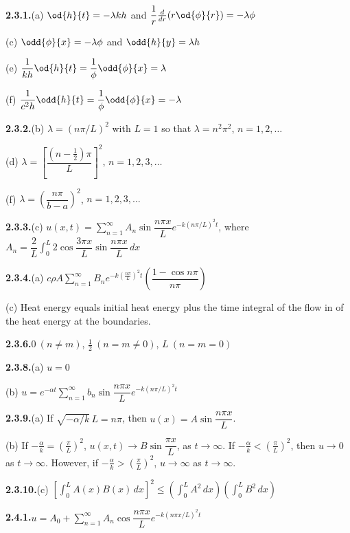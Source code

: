 \textbf{2.3.1.}\quad (a) $\od{h}{t} = -\lambda kh$ and $\dfrac{1}{r}\frac{d}{d r}\!\left(r\od{\phi}{r}\right) = -\lambda\phi$

\quad (c) $\odd{\phi}{x} = -\lambda\phi$ and $\odd{h}{y} = \lambda h$

\quad (e) $\dfrac{1}{kh}\od{h}{t} = \dfrac{1}{\phi}\odd{\phi}{x} = \lambda$

\quad (f) $\dfrac{1}{c^2 h}\odd{h}{t} = \dfrac{1}{\phi}\odd{\phi}{x} = -\lambda$

\medskip
\textbf{2.3.2.}\quad (b) $\lambda = (n\pi/L)^2$ with $L = 1$ so that $\lambda = n^2\pi^2$, $n = 1, 2, \ldots$

\quad (d) $\lambda = \left[\dfrac{(n-\frac{1}{2})\pi}{L}\right]^2$, $n = 1, 2, 3, \ldots$

\quad (f) $\lambda = \left(\dfrac{n\pi}{b-a}\right)^2$, $n = 1, 2, 3, \ldots$

\medskip
\textbf{2.3.3.}\quad (c) $u(x,t) = \sum_{n=1}^{\infty} A_n \sin\dfrac{n\pi x}{L} e^{-k(n\pi/L)^2 t}$, where
$A_n = \dfrac{2}{L}\int_0^L 2\cos\dfrac{3\pi x}{L}\sin\dfrac{n\pi x}{L}\,dx$

\medskip
\textbf{2.3.4.}\quad (a) $c\rho A \sum_{n=1}^{\infty} B_n e^{-k\left(\frac{n\pi}{L}\right)^2 t}\left(\dfrac{1-\cos n\pi}{n\pi}\right)$

\quad (c) Heat energy equals initial heat energy plus the time integral of the flow
in of the heat energy at the boundaries.

\medskip
\textbf{2.3.6.}\quad $0\ (n \neq m)$, $\frac{1}{2}\ (n = m \neq 0)$, $L\ (n = m = 0)$

\medskip
\textbf{2.3.8.}\quad (a) $u = 0$

\quad (b) $u = e^{-\alpha t}\sum_{n=1}^{\infty} b_n \sin\dfrac{n\pi x}{L} e^{-k(n\pi/L)^2 t}$

\medskip
\textbf{2.3.9.}\quad (a) If $\sqrt{-\alpha/k}\, L = n\pi$, then $u(x) = A\sin\dfrac{n\pi x}{L}$.

\quad (b) If $-\frac{\alpha}{k} = \left(\frac{\pi}{L}\right)^2$, $u(x,t) \to B\sin\dfrac{\pi x}{L}$, as $t \to \infty$. If $-\frac{\alpha}{k} < \left(\frac{\pi}{L}\right)^2$, then $u \to 0$ as $t \to \infty$. However, if $-\frac{\alpha}{k} > \left(\frac{\pi}{L}\right)^2$, $u \to \infty$ as $t \to \infty$.

\medskip
\textbf{2.3.10.}\quad (c) $\left[\int_0^L A(x)B(x)\,dx\right]^2 \leq \left(\int_0^L A^2\,dx\right)\left(\int_0^L B^2\,dx\right)$

\medskip
\textbf{2.4.1.}\quad $u = A_0 + \sum_{n=1}^{\infty} A_n \cos\dfrac{n\pi x}{L} e^{-k(n\pi x/L)^2 t}$

